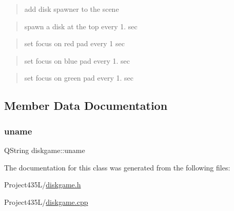 \begin{quote}
add disk spawner to the scene \end{quote}


\begin{quote}
spawn a disk at the top every 1. sec \end{quote}


\begin{quote}
set focus on red pad every 1 sec \end{quote}


\begin{quote}
set focus on blue pad every 1. sec \end{quote}


\begin{quote}
set focus on green pad every 1. sec \end{quote}


\subsection{Member Data Documentation}
\mbox{\label{classdiskgame_a47f5492c986cd8598c110788e389e32f}} 
\subsubsection{\texorpdfstring{uname}{uname}}
{\footnotesize\ttfamily Q\+String diskgame\+::uname\hspace{0.3cm}{\ttfamily [private]}}



The documentation for this class was generated from the following files\+:\begin{DoxyCompactItemize}
\item 
Project435\+L/\hyperlink{diskgame_8h}{diskgame.\+h}\item 
Project435\+L/\hyperlink{diskgame_8cpp}{diskgame.\+cpp}\end{DoxyCompactItemize}
